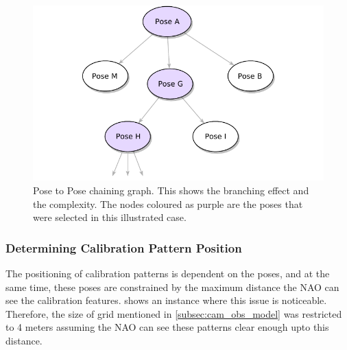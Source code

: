 \documentclass[english, printversion, nomenclature, notitle]{tuvisionthesis} %
\begin{document}
\begin{center}
	\begin{figure}
		\centering
		\includegraphics[width=0.9\columnwidth]{figures/pose-to-pose.pdf}
		\caption{Pose to Pose chaining graph. This shows the branching effect and the complexity. The nodes coloured as purple are the poses that were selected in this illustrated case.}
		\label{fig:pose-to-pose}
	\end{figure}
\end{center}

\subsubsection{Determining Calibration Pattern Position}

The positioning of calibration patterns is dependent on the poses, and at the same time, these poses are constrained by the maximum distance the NAO can see the calibration features.  shows an instance where this issue is noticeable. Therefore, the size of grid mentioned in \cref{subsec:cam_obs_model} was restricted to 4 meters assuming the NAO can see these patterns clear enough upto this distance.
\end{document}
